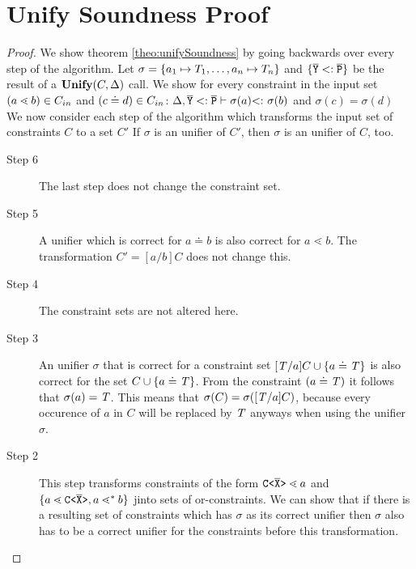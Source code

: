 \section{Unify Soundness Proof}\label{chapter:unifySoundnessProof}
\begin{proof}
    We show theorem \ref{theo:unifySoundness} by going backwards over every step of the algorithm.
    Let $\sigma = \{ a_1 \mapsto T_1, \ldots , a_n \mapsto T_n \}$ and $\{ \overline{\tt Y} <: \overline{\tt P} \}$ be the result of a $\textbf{Unify}{}(C, \Delta)$ call.
    We show for every constraint in the input set $(a \lessdot b) \in C_{in}$ and $(c \doteq d) \in C_{in}$:
    $\Delta, \overline{\tt Y} <: \overline{\tt P} \vdash \sigma(a) \textrm{$<:$}\  \sigma(b)$ and $\sigma(c) = \sigma(d)$\\
    
    We now consider each step of the \unify{} algorithm
    which transforms the input set of constraints $C$ to a set $C'$
    If $\sigma$ is an unifier of $C'$, then $\sigma$ is an unifier of $C$, too.
    
    \begin{description}
    \item[Step 6] The last step does not change the constraint set.
    \item[Step 5]
    A unifier which is correct for $a \doteq b$ is also correct for $a \lessdot b$.
    The transformation $C' = [a/b]C$ does not change this.
    
    \item[Step 4]
    The constraint sets are not altered here.
    
    \item[Step 3]
    An unifier $\sigma$ that is correct for a constraint set
    $[\mathit{T}/a]C \cup \{ a \doteq \mathit{T} \}$ is also correct for
    the set $C \cup \{ a \doteq \mathit{T} \}$.
    From the constraint $(a \doteq \mathit{T})$ it follows that $\sigma(a) = \mathit{T}$.
    This means that $\sigma(C) = \sigma([\mathit{T}/a]C)$,
    because every occurence of $a$ in $C$ will be replaced by $\mathit{T}$ anyways when using the unifier $\sigma$.
    
    \item[Step 2]
    This step transforms constraints of the form $\mathtt{C \texttt{<} \overline{\tt X} \texttt{>} } \lessdot a$ and
    $\{ a \lessdot \mathtt{C \texttt{<} \overline{\tt X} \texttt{>} }, a \lessdot^* b \}$ jinto sets of or-constraints.
    We can show that if there is a resulting set of constraints which has $\sigma$ as its correct unifier
    then $\sigma$ also has to be a correct unifier for the constraints before this transformation.
    

\end{description}
\end{proof}
